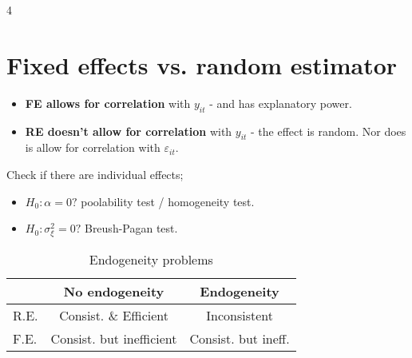 4
\section{Fixed effects vs. random estimator} %
\begin{itemize}
 \item \textbf{FE allows for correlation} with $y_{it}$ - and has explanatory power.
 \item \textbf{RE doesn't allow for correlation} with $y_{it}$ - the effect is random. Nor does is allow for correlation with $\varepsilon_{it}$.
\end{itemize}
Check if there are individual effects;
\begin{itemize}
 \item $H_0:\alpha=0?$ poolability test / homogeneity test.
 \item $H_0:\sigma_\xi^2=0?$ Breush-Pagan test.
\end{itemize}
\begin{table}[h]
 \centering
 \footnotesize
 \begin{tabular}{l|cc}
  {}   & No endogeneity           & Endogeneity         \\
  \midrule
  R.E. & Consist. \& Efficient    & Inconsistent        \\
  F.E. & Consist. but inefficient & Consist. but ineff.
 \end{tabular}
 \caption{Endogeneity problems}
 \label{tab:endogeneity}
\end{table}


